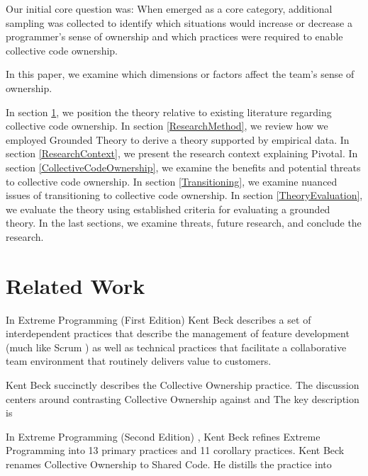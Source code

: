 Our initial core question was:  When  emerged as a core category, additional sampling was collected to identify which situations would increase or decrease a programmer's sense of ownership and which practices were required to enable collective code ownership. 

In this paper, we examine which dimensions or factors affect the team's sense of ownership.

In section \ref{RelatedWork}, we position the theory relative to existing literature regarding collective code ownership. In section \ref{ResearchMethod}, we review how we employed Grounded Theory to derive a theory supported by empirical data. In section \ref{ResearchContext}, we present the research context explaining Pivotal. In section \ref{CollectiveCodeOwnership}, we examine the benefits and potential threats to collective code ownership. In section \ref{Transitioning}, we examine nuanced issues of transitioning to collective code ownership. In section \ref{TheoryEvaluation}, we evaluate the theory using established criteria for evaluating a grounded theory. In the last sections, we examine threats, future research, and conclude the research.



\section{Related Work}
\label{RelatedWork}
In Extreme Programming (First Edition) \cite{ExtremeProgramming2000} Kent Beck describes a set of interdependent practices that describe the management of feature development (much like Scrum \cite{Scrum}) as well as technical practices that facilitate a collaborative team environment that routinely delivers value to customers. 

 Kent Beck succinctly describes the Collective Ownership practice. The discussion centers around contrasting Collective Ownership against  and  The key description is   \cite{ExtremeProgramming2000}

In Extreme Programming (Second Edition) \cite{ExtremeProgramming2004}, Kent Beck refines Extreme Programming into 13 primary practices and 11 corollary practices. Kent Beck renames Collective Ownership to Shared Code. He distills the practice into  


